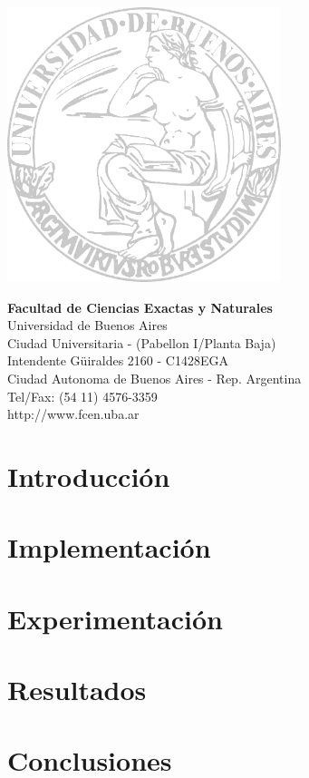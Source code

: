 \documentclass[a4paper]{article}
\begin{document}
\begin{multicols}{2}
\includegraphics[width=8cm]{caratula/logo-uba.png}

\columnbreak
\vspace*{4.5cm}
\raggedleft
\textbf{Facultad de Ciencias Exactas y Naturales}\\
Universidad de Buenos Aires\\
\small
Ciudad Universitaria - (Pabellon I/Planta Baja)\\
Intendente G\"uiraldes 2160 - C1428EGA\\
Ciudad Autonoma de Buenos Aires - Rep. Argentina\\
Tel/Fax: (54 11) 4576-3359\\
http://www.fcen.uba.ar
\end{multicols}

\restoregeometry

\clearpage


\tableofcontents

\vspace{3cm}

\clearpage

\setlength{\parindent}{10pt}

\section{Introducción}

\clearpage

\section{Implementación}

\clearpage

\section{Experimentación}

\clearpage

\section{Resultados}

\clearpage

\section{Conclusiones}

\end{document}
